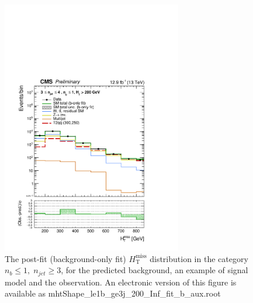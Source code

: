 \begin{figure}[tbhp]
    \caption{ 
    The post-fit (background-only fit) $H_{\mathrm{T}}^{\mathrm{miss}}$ distribution in the category $n_{b}\leq 1, \; n_{jet} \geq 3$, 
    for the predicted background, an example of signal model and the observation.
    An electronic version of this figure is available as mhtShape\_le1b\_ge3j\_200\_Inf\_fit\_b\_aux.root
    \label{fig:mhtShape_le1b_ge3j_fit_b} }
  \begin{center}
  \includegraphics[width=0.7\textwidth]{mhtShape_le1b_ge3j_200_Inf_fit_b_aux}
  \end{center}
\end{figure}


